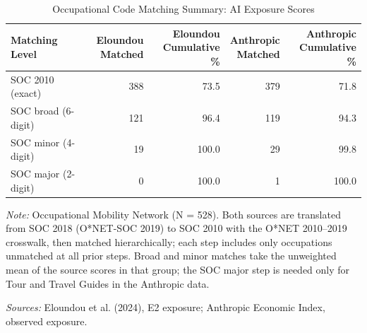 \begin{table}[H]
\centering
\caption{Occupational Code Matching Summary: AI Exposure Scores}
\label{si_tbl:ai_exposure_match_summary}
\begin{threeparttable}

\begin{tabular}{lrrrr}
\toprule
\makecell{Matching\\Level} & \makecell{Eloundou\\Matched} & \makecell{Eloundou\\Cumulative \%} & \makecell{Anthropic\\Matched} & \makecell{Anthropic\\Cumulative \%}\\
\midrule
SOC 2010 (exact) & 388 & 73.5 & 379 & 71.8\\
SOC broad (6-digit) & 121 & 96.4 & 119 & 94.3\\
SOC minor (4-digit) & 19 & 100.0 & 29 & 99.8\\
SOC major (2-digit) & 0 & 100.0 & 1 & 100.0\\
\bottomrule
\end{tabular}
\begin{tablenotes}[flushleft]
\small
\item \textit{Note: }Occupational Mobility Network (N = 528). Both sources are translated from SOC 2018 (O*NET-SOC 2019) to SOC 2010 with the O*NET 2010--2019 crosswalk, then matched hierarchically; each step includes only occupations unmatched at all prior steps. Broad and minor matches take the unweighted mean of the source scores in that group; the SOC major step is needed only for Tour and Travel Guides in the Anthropic data.
\item \textit{Sources:} Eloundou et al. (2024), E2 exposure; Anthropic Economic Index, observed exposure.
\end{tablenotes}
\end{threeparttable}
\end{table}
